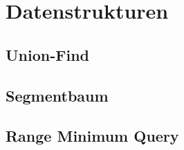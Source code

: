 \section{Datenstrukturen}

\subsection{Union-Find}


\subsection{Segmentbaum}


\subsection{Range Minimum Query}

